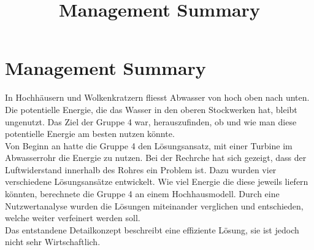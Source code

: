 \documentclass[12pt]{article}
\title{Management Summary}
\begin{document}
\section*{Management Summary}
In Hochhäusern und Wolkenkratzern fliesst Abwasser von hoch oben nach unten. Die potentielle Energie, die das Wasser in den oberen Stockwerken hat, bleibt ungenutzt. Das Ziel der Gruppe 4 war, herauszufinden, ob und wie man diese potentielle Energie am besten nutzen könnte.\\


Von Beginn an hatte die Gruppe 4 den Lösungsansatz, mit einer Turbine im Abwasserrohr die Energie zu nutzen. Bei der Rechrche hat sich gezeigt, dass der Luftwiderstand innerhalb des Rohres ein Problem ist. Dazu wurden vier verschiedene Lösungsansätze entwickelt. Wie viel Energie die diese jeweils liefern könnten, berechnete die Gruppe 4 an einem Hochhausmodell. Durch eine Nutzwertanalyse wurden die Lösungen miteinander verglichen und entschieden, welche weiter verfeinert werden soll.\\

Das entstandene Detailkonzept beschreibt eine effiziente Lösung, sie ist jedoch nicht sehr Wirtschaftlich. 


\end{document}
